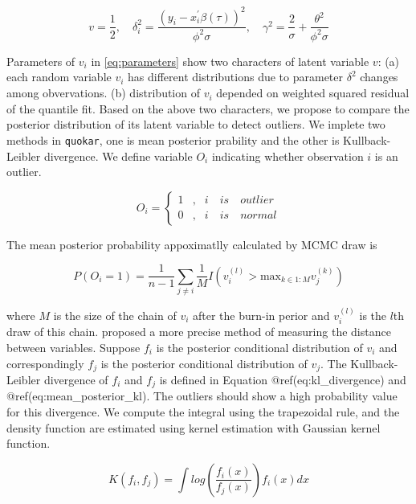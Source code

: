 \documentclass[11pt,a4paper,]{article}
\theoremstyle{definition}
\theoremstyle{definition}
\theoremstyle{remark}
\begin{document}
\begin{equation}
v=\frac{1}{2}, \quad \delta^{2}_{i}=\frac{(y_i-x^{'}_{i}\beta(\tau))^{2}}{\phi^{2}\sigma}, \quad 
\gamma^2=\frac{2}{\sigma}+\frac{\theta^{2}}{\phi^{2}\sigma}
\label{eq:parameters}
\end{equation}

Parameters of \(v_i\) in \eqref{eq:parameters} show two characters of
latent variable \(v\): (a) each random variable \(v_i\) has different
distributions due to parameter \(\delta^2\) changes among obvervations.
(b) distribution of \(v_i\) depended on weighted squared residual of the
quantile fit. Based on the above two characters, we propose to compare
the posterior distribution of its latent variable to detect outliers. We
implete two methods in \texttt{quokar}, one is mean posterior prability
and the other is Kullback-Leibler divergence. We define variable \(O_i\)
indicating whether observation \(i\) is an outlier.

\begin{equation}
O_i = \left\{
\begin{aligned}
1 & , & i \quad is \quad outlier \\
0 & , & i \quad is \quad normal
\end{aligned}
\right.
\label{eq:indicating_outlier}
\end{equation}

The mean posterior probability appoximatlly calculated by MCMC draw is

\begin{equation}
P(O_i = 1)=\frac{1}{n-1}\sum_{j \neq i}\frac{1}{M}I(v^{(l)}_{i}> \text{max}_{k \in 1:M}v^{(k)}_j)
\label{eq:mcmc_draw}
\end{equation}

where \(M\) is the size of the chain of \(v_i\) after the burn-in perior
and \(v^{(l)}_i\) is the \(l\)th draw of this chain.
\textcite{kullback1951information} proposed a more precise method of
measuring the distance between variables. Suppose \(f_i\) is the
posterior conditional distribution of \(v_i\) and correspondingly
\(f_j\) is the posterior conditional distribution of \(v_j\). The
Kullback-Leibler divergence of \(f_i\) and \(f_j\) is defined in
Equation @ref(eq:kl\_divergence) and @ref(eq:mean\_posterior\_kl). The
outliers should show a high probability value for this divergence. We
compute the integral using the trapezoidal rule, and the density
function are estimated using kernel estimation with Gaussian kernel
function.

\begin{equation}
K(f_i, f_j)=\int log(\frac{f_i(x)}{f_j(x)})f_{i}(x)dx
\label{eq:kl_divergence}
\end{equation}
\end{document}
